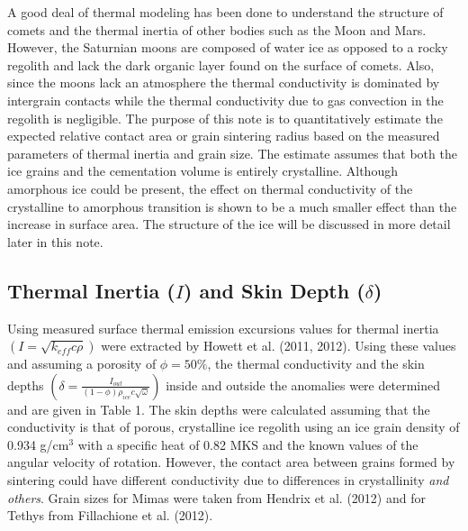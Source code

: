 \documentclass[11pt]{article} %
\begin{document}
	A good deal of thermal modeling has been done to understand the structure of comets and the thermal inertia of other bodies such as the Moon and Mars. However, the Saturnian moons are composed of water ice as opposed to a rocky regolith and lack the dark organic layer found on the surface of comets. Also, since the moons lack an atmosphere the thermal conductivity is dominated by intergrain contacts while the thermal conductivity due to gas convection in the regolith is negligible. The purpose of this note is to quantitatively estimate the expected relative contact area or grain sintering radius based on the measured parameters of thermal inertia and grain size. The estimate assumes that both the ice grains and the cementation volume is entirely crystalline. Although amorphous ice could be present, the effect on thermal conductivity of the crystalline to amorphous transition is shown to be a much smaller effect than the increase in surface area. The structure of the ice will be discussed in more detail later in this note. 
	

\subsection{Thermal Inertia ($I$) and Skin Depth ($\delta$)}

		Using measured surface thermal emission excursions values for thermal inertia $\left( I = \sqrt{k_{eff}c\rho} \right)$ were extracted by Howett et al. (2011, 2012). Using these values and assuming a porosity of $\phi = 50\%$, the thermal conductivity and the skin depths $ \left( \delta = \frac{I_{out}}{(1-\phi)\rho_{ice} c \sqrt{\omega}} \right)$ inside and outside the anomalies were determined and are given in Table 1. The skin depths were calculated assuming that the conductivity is that of porous, crystalline ice regolith using an ice grain density of 0.934 g/cm$^{3}$ with a specific heat of 0.82 MKS and the known values of the angular velocity of rotation. However, the contact area between grains formed by sintering could have different conductivity due to differences in crystallinity \emph{and others}. Grain sizes for Mimas were taken from Hendrix et al. (2012) and for Tethys from Fillachione et al. (2012). 
	
\end{document}
